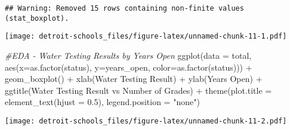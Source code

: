 \documentclass[
]{article}
\newenvironment{Shaded}{\begin{snugshade}}{\end{snugshade}}
\newcommand{\AttributeTok}[1]{\textcolor[rgb]{0.77,0.63,0.00}{#1}}
\newcommand{\CommentTok}[1]{\textcolor[rgb]{0.56,0.35,0.01}{\textit{#1}}}
\newcommand{\ConstantTok}[1]{\textcolor[rgb]{0.00,0.00,0.00}{#1}}
\newcommand{\FloatTok}[1]{\textcolor[rgb]{0.00,0.00,0.81}{#1}}
\newcommand{\FunctionTok}[1]{\textcolor[rgb]{0.00,0.00,0.00}{#1}}
\newcommand{\NormalTok}[1]{#1}
\newcommand{\OtherTok}[1]{\textcolor[rgb]{0.56,0.35,0.01}{#1}}
\newcommand{\SpecialCharTok}[1]{\textcolor[rgb]{0.00,0.00,0.00}{#1}}
\newcommand{\StringTok}[1]{\textcolor[rgb]{0.31,0.60,0.02}{#1}}
\begin{document}
\begin{verbatim}
## Warning: Removed 15 rows containing non-finite values (stat_boxplot).
\end{verbatim}

\texttt{[image: detroit-schools\_files/figure-latex/unnamed-chunk-11-1.pdf]}

\begin{Shaded}
\begin{Highlighting}[]
\CommentTok{\#EDA {-} Water Testing Results by Years Open}
\FunctionTok{ggplot}\NormalTok{(}\AttributeTok{data =}\NormalTok{ total, }\FunctionTok{aes}\NormalTok{(}\AttributeTok{x=}\FunctionTok{as.factor}\NormalTok{(status), }\AttributeTok{y=}\NormalTok{years\_open,}
                        \AttributeTok{color=}\FunctionTok{as.factor}\NormalTok{(status))) }\SpecialCharTok{+}
  \FunctionTok{geom\_boxplot}\NormalTok{() }\SpecialCharTok{+}
  \FunctionTok{xlab}\NormalTok{(}\StringTok{\textquotesingle{}Water Testing Result\textquotesingle{}}\NormalTok{) }\SpecialCharTok{+}
  \FunctionTok{ylab}\NormalTok{(}\StringTok{\textquotesingle{}Years Open\textquotesingle{}}\NormalTok{) }\SpecialCharTok{+}
  \FunctionTok{ggtitle}\NormalTok{(}\StringTok{\textquotesingle{}Water Testing Result vs Number of Grades\textquotesingle{}}\NormalTok{)  }\SpecialCharTok{+} 
  \FunctionTok{theme}\NormalTok{(}\AttributeTok{plot.title =} \FunctionTok{element\_text}\NormalTok{(}\AttributeTok{hjust =} \FloatTok{0.5}\NormalTok{), }\AttributeTok{legend.position =} \StringTok{"none"}\NormalTok{)}
\end{Highlighting}
\end{Shaded}

\texttt{[image: detroit-schools\_files/figure-latex/unnamed-chunk-11-2.pdf]}

\begin{Shaded}
\end{Shaded}
\end{document}
